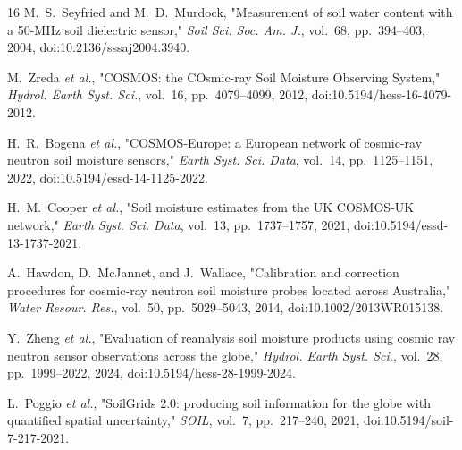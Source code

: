 \documentclass[journal]{IEEEtran}
\begin{document}
\begin{thebibliography}{16}
M.~S.~Seyfried and M.~D.~Murdock, "Measurement of soil water content
with a 50-MHz soil dielectric sensor," \emph{Soil Sci. Soc. Am. J.},
vol.~68, pp.~394–403, 2004, doi:10.2136/sssaj2004.3940.

M.~Zreda \emph{et al.}, "COSMOS: the COsmic-ray Soil Moisture
Observing System," \emph{Hydrol. Earth Syst. Sci.}, vol.~16,
pp.~4079–4099, 2012, doi:10.5194/hess-16-4079-2012.

H.~R.~Bogena \emph{et al.}, "COSMOS-Europe: a European network of
cosmic-ray neutron soil moisture sensors," \emph{Earth Syst. Sci.
Data}, vol.~14, pp.~1125–1151, 2022,
doi:10.5194/essd-14-1125-2022.

H.~M.~Cooper \emph{et al.}, "Soil moisture estimates from the UK
COSMOS-UK network," \emph{Earth Syst. Sci. Data}, vol.~13,
pp.~1737–1757, 2021, doi:10.5194/essd-13-1737-2021.

A.~Hawdon, D.~McJannet, and J.~Wallace, "Calibration and correction
procedures for cosmic-ray neutron soil moisture probes located across
Australia," \emph{Water Resour. Res.}, vol.~50, pp.~5029–5043, 2014,
doi:10.1002/2013WR015138.

Y.~Zheng \emph{et al.}, "Evaluation of reanalysis soil moisture
products using cosmic ray neutron sensor observations across the
globe," \emph{Hydrol. Earth Syst. Sci.}, vol.~28, pp.~1999–2022,
2024, doi:10.5194/hess-28-1999-2024.

L.~Poggio \emph{et al.}, "SoilGrids 2.0: producing soil information
for the globe with quantified spatial uncertainty," \emph{SOIL},
vol.~7, pp.~217–240, 2021, doi:10.5194/soil-7-217-2021.

\end{thebibliography}
\end{document}
